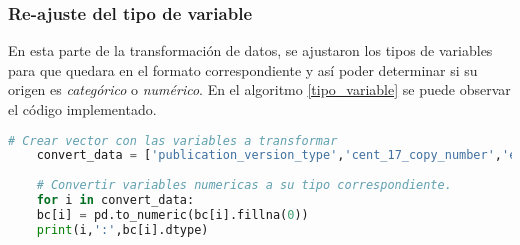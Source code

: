 \subsubsection{Re-ajuste del tipo de variable }
En esta parte de la transformación de datos, se ajustaron los tipos de variables para que quedara en el formato correspondiente y así poder determinar si su origen es \textit{categórico} o \textit{numérico}. En el algoritmo \ref{tipo_variable} se puede observar el código implementado. 

\begin{lstlisting}[basicstyle=\scriptsize,language=Python, label=tipo_variable, caption=Re-ajustar tipo de variables en Python.]
	# Crear vector con las variables a transformar
	convert_data = ['publication_version_type','cent_17_copy_number','er_positivity_scale_used','her_2_copy_number','her_2_ihc_score','ihc_score','positive_lymph_keratin','pr_positivity_ihc_intensity_score','pr_positivity_scale_used','fraction_genome_altered','number_samples','tmb_nonsynonymous','her_2_cent_17_ratio','lymph_examined_number','mutation_count','overall_survival_months','disease_free_months','days_last_followup']
	
	# Convertir variables numericas a su tipo correspondiente.
	for i in convert_data:
	bc[i] = pd.to_numeric(bc[i].fillna(0))
	print(i,':',bc[i].dtype)
\end{lstlisting}


